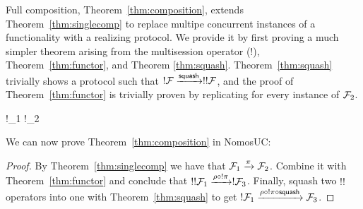 Full composition, Theorem~\ref{thm:composition}, extends Theorem~\ref{thm:singlecomp} to replace multipe concurrent instances of a functionality with a realizing protocol.
We provide it by first proving a much simpler theorem arising from the multisession operator ($!$), Theorem~\ref{thm:functor}, and Theorem \ref{thm:squash}.
Theorem~\ref{thm:squash} trivially shows a protocol  such that $!\mathcal{F} \xrightarrow{\mathsf{squash}} !!\mathcal{F}$, and the proof of Theorem~\ref{thm:functor} is trivially proven by replicating \SIM{\pi} for every instance of $\mathcal{F}_2$.  

\begin{theorem}\label{thm:functor}
	\begin{mathpar}
		{
			!\F_1 \xrightarrow{!\pi} !\F_2
		}
	\end{mathpar}
\end{theorem}

We can now prove Theorem~\ref{thm:composition} in NomosUC:
\begin{proof}
By Theorem~\ref{thm:singlecomp} we have that $\mathcal{F}_1 \xrightarrow{\pi} \mathcal{F}_2$. Combine it with Theorem~\ref{thm:functor} and conclude that $!!\mathcal{F}_1 \xrightarrow{\rho \circ !\pi} !\mathcal{F}_3$. 
Finally, squash two $!!$ operators into one with Theorem~\ref{thm:squash} to get $!\mathcal{F}_1 \xrightarrow{\rho \circ !\pi \circ \mathsf{squash}} \mathcal{F}_3$.
\end{proof}

